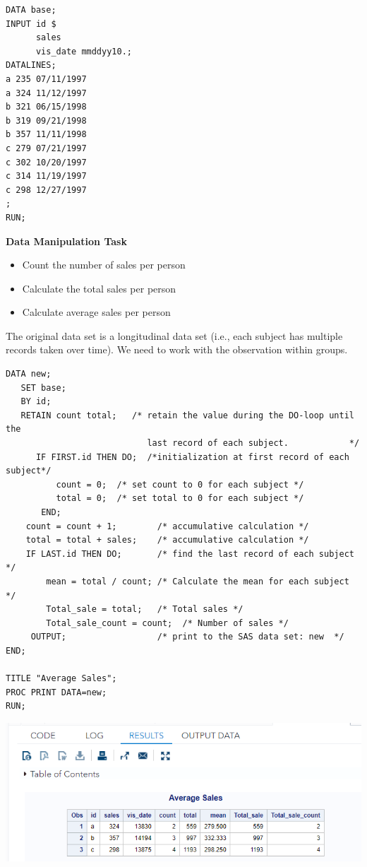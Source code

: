 \documentclass[
]{book}
\begin{document}
\begin{verbatim}
DATA base;
INPUT id $ 
      sales
      vis_date mmddyy10.;
DATALINES;
a 235 07/11/1997
a 324 11/12/1997
b 321 06/15/1998
b 319 09/21/1998
b 357 11/11/1998
c 279 07/21/1997               
c 302 10/20/1997                 
c 314 11/19/1997  
c 298 12/27/1997                                
;
RUN;
\end{verbatim}

\textbf{Data Manipulation Task}

\begin{itemize}
\item
  Count the number of sales per person
\item
  Calculate the total sales per person
\item
  Calculate average sales per person
\end{itemize}

The original data set is a longitudinal data set (i.e., each subject has multiple records taken over time). We need to work with the observation within groups.

\begin{verbatim}
DATA new;
   SET base;
   BY id;
   RETAIN count total;   /* retain the value during the DO-loop until the
                            last record of each subject.            */
      IF FIRST.id THEN DO;  /*initialization at first record of each subject*/
          count = 0;  /* set count to 0 for each subject */
          total = 0;  /* set total to 0 for each subject */
       END;
    count = count + 1;        /* accumulative calculation */
    total = total + sales;    /* accumulative calculation */
    IF LAST.id THEN DO;       /* find the last record of each subject */
        mean = total / count; /* Calculate the mean for each subject */
        Total_sale = total;   /* Total sales */
        Total_sale_count = count;  /* Number of sales */
     OUTPUT;                  /* print to the SAS data set: new  */
END;

TITLE "Average Sales";
PROC PRINT DATA=new; 
RUN;
\end{verbatim}

\begin{center}\includegraphics[width=1\linewidth]{img10/w10-RetainExample} \end{center}
\end{document}
